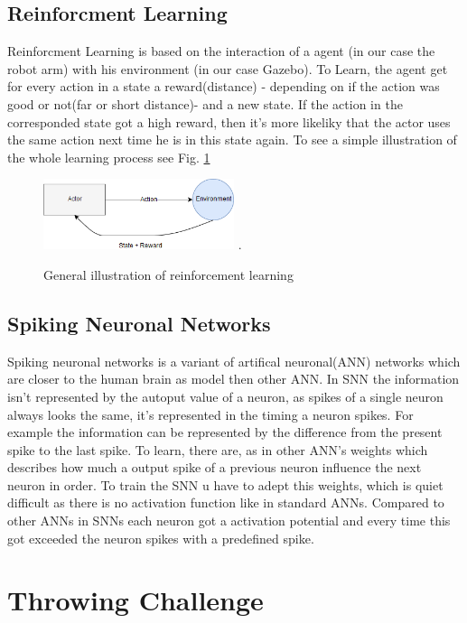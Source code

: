 \subsection{Reinforcment Learning}
Reinforcment Learning is based on the interaction of a agent (in our case the robot arm) with his environment (in our case Gazebo). To Learn, the agent get for every action in a state a reward(distance) - depending on if the action was good or not(far or short distance)- and a new state. If the action in the corresponded state got a high reward, then it's more likeliky that the actor uses the same action next time he is in this state again. To see a simple illustration of the whole learning process see Fig. \ref{re_base}
\begin{figure}[H]
	\centering
	\includegraphics[width=2.2in]{img/re_base.png}
	\DeclareGraphicsExtensions.
	\caption{General illustration of reinforcement learning}
	\label{re_base}
\end{figure}

\subsection{Spiking Neuronal Networks}
Spiking neuronal networks is a variant of artifical neuronal(ANN) networks which are closer to the human brain as model then other ANN. In SNN the information isn't represented by the autoput value of a neuron, as spikes of a single neuron always looks the same, it's represented in the timing a neuron spikes. For example the information can be represented by the difference from the present spike to the last spike. To learn, there are, as in other ANN's weights which describes how much a output spike of a previous neuron influence the next neuron in order. To train the SNN u have to adept this weights, which is quiet difficult as there is no activation function like in standard ANNs. Compared to other ANNs in SNNs each neuron got a activation potential and every time this got exceeded the neuron spikes with a predefined spike.

\section{Throwing Challenge}
